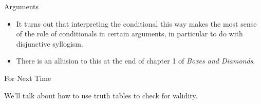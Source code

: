 \documentclass[
  ignorenonframetext,
]{beamer}
\providecommand{\tightlist}{%
  \setlength{\itemsep}{0pt}\setlength{\parskip}{0pt}}
\renewcommand{\,}{\text{, }}
\begin{document}
\begin{frame}{Arguments}
\protect\hypertarget{arguments}{}

\begin{itemize}
\tightlist
\item
  It turns out that interpreting the conditional this way makes the most
  sense of the role of conditionals in certain arguments, in particular
  to do with disjunctive syllogism.
\item
  There is an allusion to this at the end of chapter 1 of \emph{Boxes
  and Diamonds}.
\end{itemize}

\end{frame}

\begin{frame}{For Next Time}
\protect\hypertarget{for-next-time}{}

We'll talk about how to use truth tables to check for validity.

\end{frame}
\end{document}

